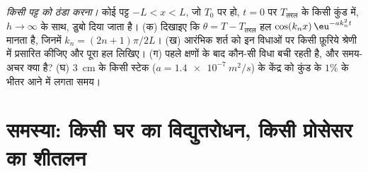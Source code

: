 \begin{exercise}[$\star\star\star$]\label{exo:b2:heat-conduction:12}
\emph{किसी पट्ट को ठंडा करना।} कोई पट्ट $-L < x < L$, जो $T_0$ पर हो, $t =
0$ पर $T_{\text{तरल}}$ के किसी कुंड में, $h \to \infty$ के साथ, डुबो दिया जाता है। (क) दिखाइए कि $\theta =
T - T_{\text{तरल}}$ हल $\cos(k_nx)\,\eu^{-ak_n^2t}$ मानता है, जिनमें $k_n
= (2n+1)\pi/2L$। (ख) आरंभिक शर्त को इन विधाओं पर किसी फ़ूरिये श्रेणी में
प्रसारित कीजिए और पूरा हल लिखिए। (ग) पहले क्षणों के बाद
कौन-सी विधा बची रहती है, और समय-अचर क्या है? (घ) \qty{3}{cm} के किसी स्टेक
($a = \qty{1.4e-7}{m^2/s}$) के केंद्र को कुंड के $1\%$ के भीतर आने में
लगता समय।
\end{exercise}

\section{समस्या: किसी घर का विद्युतरोधन, किसी प्रोसेसर का शीतलन}

